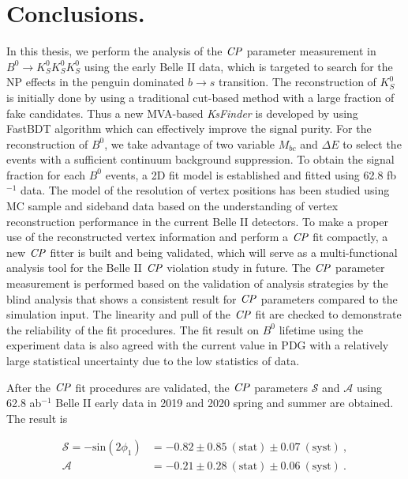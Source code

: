 \section{Conclusions.}
In this thesis, we perform the analysis of the $\it{CP}$ parameter measurement in $B^0 \to K_S^0  K_S^0  K_S^0$ using the early Belle II data, which is targeted to search for the NP effects in the penguin dominated $b\to s$ transition. The reconstruction of $K_S^0$ is initially done by using a traditional cut-based method with a large fraction of fake candidates. Thus a new MVA-based \textit{KsFinder} is developed by using FastBDT algorithm  which can effectively improve the signal purity. For the reconstruction of $B^0$, we take advantage of two variable $M_{bc}$ and $\Delta E$ to select the events with a sufficient continuum background suppression. To obtain the signal fraction for each $B^0$ events, a 2D fit model is established and fitted using 62.8 fb$^{-1}$ data. 
The model of the resolution of vertex positions has been studied using MC sample and sideband data based on the understanding of vertex reconstruction performance in the current Belle II detectors. To make a proper use of the reconstructed vertex information and perform a $\it{CP}$ fit compactly, a new $\it{CP}$ fitter is built and being validated, which will serve as a multi-functional analysis tool for the Belle II $\it{CP}$ violation study in future. 
The $\it{CP}$ parameter measurement is performed based on the validation of analysis strategies by the blind analysis that shows a consistent result for $\it{CP}$ parameters compared to the simulation input. The linearity and pull of the $\it{CP}$ fit are checked to demonstrate the reliability of the fit procedures. The fit result on $B^0$ lifetime using the experiment data is also agreed with the current value in PDG with a relatively large statistical uncertainty due to the low statistics of data.

After the $\it{CP}$ fit procedures are validated, the $\it{CP}$ parameters $\mathcal{S}$ and $\mathcal{A}$ using 62.8 ab$^{-1}$ Belle II early data in 2019 and 2020 spring and summer are obtained. The result is

\begin{equation}\label{eq:data_fit_cp}
\begin{split}
\mathcal{S}=- \text{sin}(2\phi_1) & = -0.82 \pm 0.85~(\text{stat}) \pm 0.07~(\text{syst})~, \\
\mathcal{A} & = -0.21\pm 0.28~(\text{stat}) \pm 0.06~(\text{syst})~.\\
\end{split}
\end{equation}  

